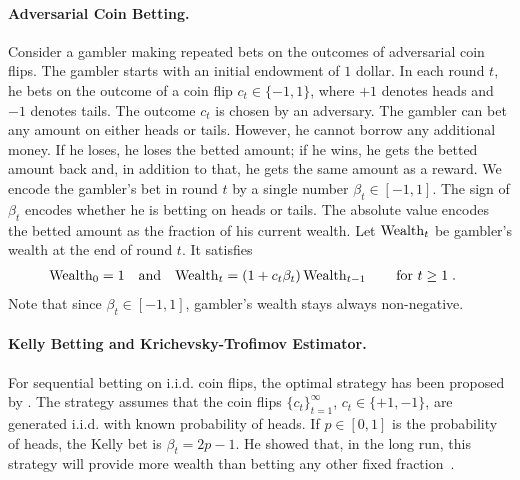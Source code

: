 \paragraph{Adversarial Coin Betting.}
Consider a gambler making repeated bets on the outcomes of adversarial coin
flips. The gambler starts with an initial endowment of $1$ dollar. In each
round $t$, he bets on the outcome of a coin flip $c_t \in \{-1,1\}$, where $+1$
denotes heads and $-1$ denotes tails.  The outcome $c_t$ is chosen by an
adversary.  The gambler can bet any amount on either heads or tails. However,
he cannot borrow any additional money. If he loses, he loses the betted amount;
if he wins, he gets the betted amount back and, in addition to that, he gets
the same amount as a reward.  We encode the gambler's bet in round $t$ by a
single number $\beta_t \in [-1,1]$. The sign of $\beta_t$ encodes whether he is
betting on heads or tails. The absolute value encodes the betted amount as the
fraction of his current wealth.  Let $\operatorname{Wealth}_t$ be gambler's wealth at the end
of round $t$. It satisfies
\begin{align}
\label{equation:wealth-recurrence}
\operatorname{Wealth}_0 & = 1 &
& \text{and} &
\operatorname{Wealth}_t & = (1 + c_t \beta_t) \operatorname{Wealth}_{t-1} \qquad \text{for $t \ge 1$} \; .
\end{align}
Note that since $\beta_t \in [-1,1]$, gambler's wealth stays always
non-negative.

\paragraph{Kelly Betting and Krichevsky-Trofimov Estimator.}
For sequential betting on i.i.d. coin flips, the optimal strategy has been
proposed by \citet{Kelly-1956}.  The strategy assumes that the coin flips
$\{c_t\}_{t=1}^\infty$, $c_t \in \{+1,-1\}$, are generated i.i.d. with known
probability of heads. If $p \in [0,1]$ is the probability of heads, the Kelly
bet is $\beta_t = 2p - 1$. He showed that, in the long run, this strategy will
provide more wealth than betting any other fixed fraction~\citep{Kelly-1956}.

